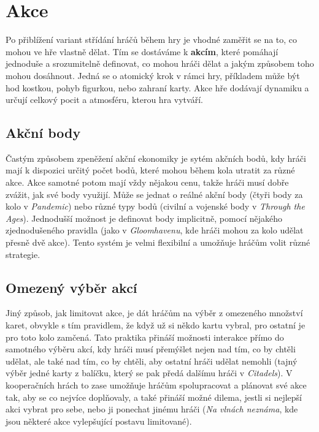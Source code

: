 
\section{Akce}
\label{sec:actions}

Po přiblížení variant střídání hráčů během hry je vhodné zaměřit se na to, co mohou ve hře vlastně dělat. Tím se dostáváme k \textbf{akcím}, které pomáhají jednoduše a srozumitelně definovat, co mohou hráči dělat a jakým způsobem toho mohou dosáhnout. Jedná se o atomický krok v rámci hry, příkladem může být hod kostkou, pohyb figurkou, nebo zahraní karty. Akce hře dodávají dynamiku a určují celkový pocit a atmosféru, kterou hra vytváří.

\subsection{Akční body}
\label{subsec:actions_action_points}

Častým způsobem zpeněžení akční ekonomiky je sytém akčních bodů, kdy hráči mají k dispozici určitý počet bodů, které mohou během kola utratit za různé akce. Akce samotné potom mají vždy nějakou cenu, takže hráči musí dobře zvážit, jak své body využijí. Může se jednat o reálné akční body (čtyři body za kolo v \textit{Pandemic}) nebo různé typy bodů (civilní a vojenské body v \textit{Through the Ages}). Jednodušší možnost je definovat body implicitně, pomocí nějakého zjednodušeného pravidla (jako v \textit{Gloomhavenu}, kde hráči mohou za kolo udělat přesně dvě akce). Tento systém je velmi flexibilní a umožňuje hráčům volit různé strategie.

\subsection{Omezený výběr akcí}
\label{subsec:actions_limited_actions}

Jiný způsob, jak limitovat akce, je dát hráčům na výběr z omezeného množství karet, obvykle s tím pravidlem, že když už si někdo kartu vybral, pro ostatní je pro toto kolo zamčená. Tato praktika přináší možnosti interakce přímo do samotného výběru akcí, kdy hráči musí přemýšlet nejen nad tím, co by chtěli udělat, ale také nad tím, co by chtěli, aby ostatní hráči udělat nemohli (tajný výběr jedné karty z balíčku, který se pak předá dalšímu hráči v \textit{Citadels}). V kooperačních hrách to zase umožňuje hráčům spolupracovat a plánovat své akce tak, aby se co nejvíce doplňovaly, a také přináší možné dilema, jestli si nejlepší akci vybrat pro sebe, nebo ji ponechat jinému hráči (\textit{Na vlnách neznáma}, kde jsou některé akce vylepšující postavu limitované).

